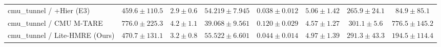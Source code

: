 \begin{table}[t]
\begin{tabular}{lccccccc}
cmu\_tunnel / +Hier (E3) & $459.6 \pm 110.5$ & $2.9 \pm 0.6$ & $54.219 \pm 7.945$ & $0.038 \pm 0.012$ & $\mathbf{5.06 \pm 1.42}$ & $265.9 \pm 24.1$ & $\mathbf{84.9 \pm 85.1}$ \\
cmu\_tunnel / CMU M-TARE & $\mathbf{776.0 \pm 225.3}$ & $\mathbf{4.2 \pm 1.1}$ & $\mathbf{39.068 \pm 9.561}$ & $\mathbf{0.120 \pm 0.029}$ & $4.57 \pm 1.27$ & $301.1 \pm 5.6$ & $776.5 \pm 145.2$ \\
cmu\_tunnel / Lite-HMRE (Ours) & $470.7 \pm 131.1$ & $3.2 \pm 0.8$ & $55.522 \pm 6.601$ & $0.044 \pm 0.014$ & $4.97 \pm 1.39$ & $291.3 \pm 43.3$ & $194.5 \pm 114.4$ \\
\bottomrule
\end{tabular}
\end{table}

